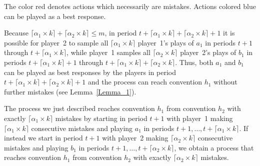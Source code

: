 \begin{table}[h]
\caption{Case 1 Example Transition}
\label{tab:case1exampletransition} 
\centering
{}
\small
The color red denotes actions which necessarily are mistakes. Actions colored blue can be played as a best response.
\end{table}


Because $\lceil \alpha_1 \times k \rceil + \lceil \alpha_2 \times k \rceil \leq m$, in period $t + \lceil \alpha_1 \times k \rceil + \lceil \alpha_2 \times k \rceil + 1$ it is possible for player~2 to sample all $\lceil \alpha_1 \times k \rceil$ player~1's plays of $a_1$ in periods $t + 1$ through $t + \lceil \alpha_1 \times k \rceil$, while player~1 samples all $\lceil \alpha_2 \times k \rceil $ player~2's plays of $b_1$ in periods $t+\lceil \alpha_1 \times k \rceil + 1$ through $t + \lceil \alpha_1 \times k \rceil + \lceil \alpha_2 \times k \rceil$. Thus, both $a_1$ and $b_1$ can be played as best responses by the players in period $t + \lceil \alpha_1 \times k \rceil + \lceil \alpha_2 \times k \rceil + 1$ and the process can reach convention $h_1$ without further mistakes (see Lemma~\ref{Lemma_1}). 

The  process we just described reaches convention $h_1$ from convention $h_2$ with exactly $\lceil \alpha_1 \times k \rceil$ mistakes by starting in period $t+1$ with player~1 making $\lceil \alpha_1 \times k \rceil$ consecutive mistakes and playing $a_1$ in periods $t+1, \dots, t+ \lceil \alpha_1 \times k \rceil$. If instead we start in period $t+1$ with player~2 making $\lceil \alpha_2 \times k \rceil$ consecutive mistakes and playing $b_1$ in periods $t+1, \dots, t+ \lceil \alpha_2 \times k \rceil$, we obtain a process that reaches convention $h_1$ from convention $h_2$ with exactly $\lceil \alpha_2 \times k \rceil$ mistakes. 

